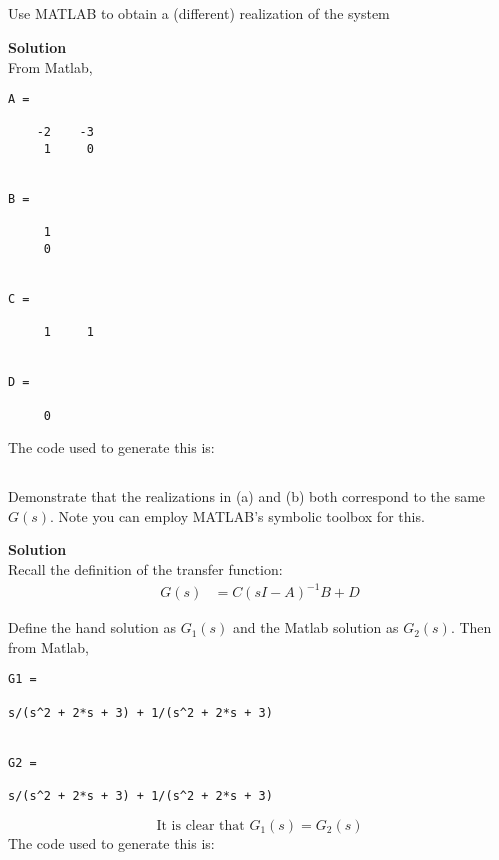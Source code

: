 \subsection{}
Use MATLAB to obtain a (different) realization of the system

\textbf{Solution} \\
From Matlab,
\begin{verbatim}
A =

    -2    -3
     1     0


B =

     1
     0


C =

     1     1


D =

     0
\end{verbatim}

The code used to generate this is:


\subsection{}
Demonstrate that the realizations in (a) and (b) both correspond to the same $G(s)$. Note you
can employ MATLAB's symbolic toolbox for this.

\textbf{Solution} \\
Recall the definition of the transfer function:
\begin{align*}
    G(s) &= C(sI - A)^{-1} B + D
\end{align*}

Define the hand solution as $G_1(s)$ and the Matlab solution as $G_2(s)$. Then from Matlab,
\begin{verbatim}
G1 =

s/(s^2 + 2*s + 3) + 1/(s^2 + 2*s + 3)
    
    
G2 =
    
s/(s^2 + 2*s + 3) + 1/(s^2 + 2*s + 3)
\end{verbatim}
\[\boxed{\text{It is clear that } G_1(s) = G_2(s)}\]
The code used to generate this is:



